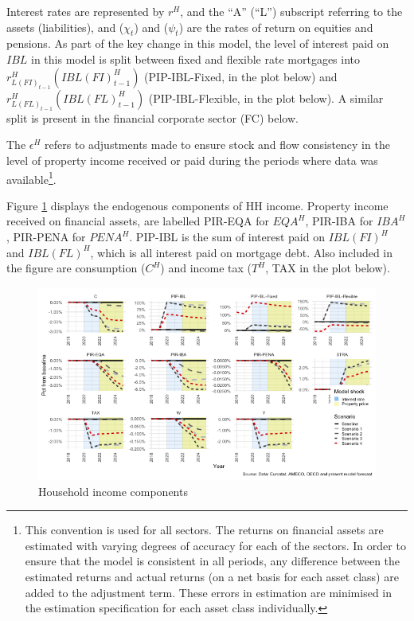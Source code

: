 \documentclass[
]{book}
\begin{document}
Interest rates are represented by \(r^H\), and the ``A'' (``L'') subscript referring to the assets (liabilities), and (\(\chi _t\)) and (\(\psi _t\)) are the rates of return on equities and pensions. As part of the key change in this model, the level of interest paid on \(IBL\) in this model is split between fixed and flexible rate mortgages into \(r^H_{L(FI)_{t-1}}(IBL(FI)^H_{t-1})\) (PIP-IBL-Fixed, in the plot below) and \(r^H_{L(FL)_{t-1}}(IBL(FL)^H_{t-1})\) (PIP-IBL-Flexible, in the plot below). A similar split is present in the financial corporate sector (FC) below.

The \(\epsilon ^H\) refers to adjustments made to ensure stock and flow consistency in the level of property income received or paid during the periods where data was available\footnote{This convention is used for all sectors. The returns on financial assets are estimated with varying degrees of accuracy for each of the sectors. In order to ensure that the model is consistent in all periods, any difference between the estimated returns and actual returns (on a net basis for each asset class) are added to the adjustment term. These errors in estimation are minimised in the estimation specification for each asset class individually.}.

Figure \ref{fig:fl-fi-sfc-plot-hh-indicators-y} displays the endogenous components of HH income. Property income received on financial assets, are labelled PIR-EQA for \(EQA^H\), PIR-IBA for \(IBA^H\), PIR-PENA for \(PENA^H\). PIP-IBL is the sum of interest paid on \(IBL(FI)^H\) and \(IBL(FL)^H\), which is all interest paid on mortgage debt. Also included in the figure are consumption (\(C^H\)) and income tax (\(T^H\), TAX in the plot below).

\begin{figure}[H]
\includegraphics[width=0.95\linewidth]{figures/fl-fi-sfc-plot-hh-indicators-y-1} \caption{Household income components}\label{fig:fl-fi-sfc-plot-hh-indicators-y}
\end{figure}
\end{document}
